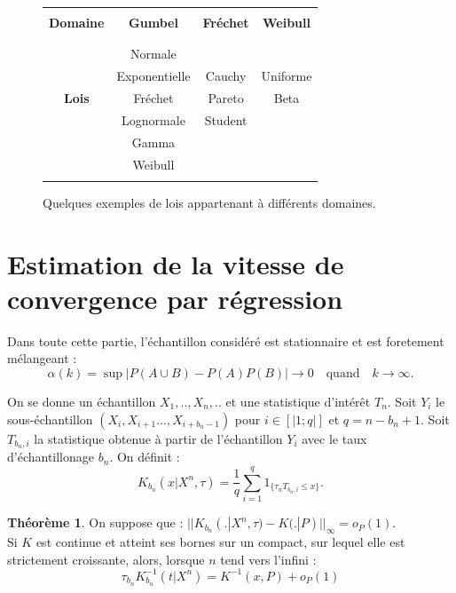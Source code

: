 \documentclass{article}
\theoremstyle{definition}
\newtheorem{thm}{Théorème}
\begin{document}
\begin{figure}[!h]\centering
\begin{tabular}{|c|c|c|c|}
\hline
& & & \\
\textbf{Domaine} & \textbf{Gumbel	} 	&	\textbf{ Fréchet }	 & \textbf{Weibull} 	\\
& & & \\
\hline
& & & \\
 	&       Normale 	&         	  	&             	\\
 	& 	Exponentielle & 	Cauchy	 &	 Uniforme 		\\
\textbf{Lois} 	&	Fréchet 	&  	Pareto	 &	Beta\\
	&	Lognormale 	& 	Student 	&				\\
	& 	Gamma 		&  		&				\\
	&	 Weibull  		&		&	\\
& & & \\
\hline
\end{tabular}
\label{tab}
\caption{Quelques exemples de lois appartenant à différents domaines.}
\end{figure}



\section{Estimation de la vitesse de convergence par régression}

Dans toute cette partie, l'échantillon considéré est stationnaire et est foretement mélangeant : \[\alpha(k)=\sup |P(A\cup B)-P(A)P(B)|\rightarrow 0 \quad \text{quand}\quad k\rightarrow\infty.\] 

On se donne un échantillon $X_1,..,X_n,..$ et une statistique d'intérêt $T_n$. Soit $Y_i$ le sous-échantillon $(X_i,X_{i+1}...,X_{i+b_n-1})$ pour $i\in[|1;q|]$ et $q=n-b_n+1$. Soit $T_{b_n,i}$ la statistique obtenue à partir de l'échantillon $Y_i$ avec le taux d'échantillonage $b_n$. On définit :
\[K_{b_n}(x|X^n,\tau)=\frac{1}{q}\sum_{i=1}^q  1_{\{\tau_n T_{b_n,i}\leq x\}}.\]

\begin{thm} \label{Reg} On suppose que : $||K_{b_n}(.|X^n,\tau)-K(.|P)||_\infty = o_P(1)$.\\
Si $K$ est continue et atteint ses bornes sur un compact, sur lequel elle est strictement croissante, alors, lorsque $n$ tend vers l'infini :
\[\tau_{b_n} K^{-1}_{b_n}(t|X^n)=K^{-1}(x,P)+ o_P(1)\]
\end{thm}
\end{document}
